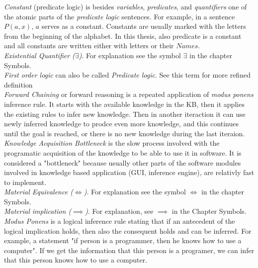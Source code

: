 \emph{Constant} (predicate logic) is besides \emph{variables}, 
\emph{predicates}, and \emph{quantifiers} one of the atomic parts of the 
\emph{predicate logic} sentences. For example, in a sentence $P(a,x)$, $a$ 
serves as a constant. Constants are usually marked with the letters from the
beginning of the alphabet. In this thesis, also predicate is a constant and
all constants are written either with letters or their $Names$.\\

\emph{Existential Quantifier ($\exists$)}. For explanation see the symbol
$\exists$ in the chapter Symbols.\\

\emph {First order logic} can also be called \emph{Predicate logic}. See this
term for more refined definition\\

\emph{Forward Chaining} or forward reasoning is a repeated application of
\emph{modus ponens} inference rule. It starts with the available knowledge in 
the KB, then it applies the existing rules to infer new knowledge. Then in
another iteraction it can use newly inferred knowledge to prodce even more 
knowledge, and this continues until the goal is reached, or there is no new
knowledge during the last iteraion.\\

\emph{Knowledge Acquisition Bottleneck} is the slow process involved with
the programatic acquisition of the knowledge to be able to use it in software.
It is considered a "bottleneck" because usually other parts of the software
modules involved in knowledge based application (GUI, inference engine), are
relativly fast to implement.\\

\emph{Material Equivalence ($\iff$)}. For explanation see the symbol $\iff$ in the
chapter Symbols.\\

\emph{Material implication ($\implies$)}. For explanation, see $\implies$ in the
Chapter Symbols.\\

\emph{Modus Ponens} is a logical inference rule stating that if an antecedent
of the logical implication holds, then also the consequent holds and can be
inferred. For example, a statement "if person is a 
programmer, then he knows how to use a computer". If we get the information
that this person is a programer, we can infer that this person knows how to
use a computer. \\

